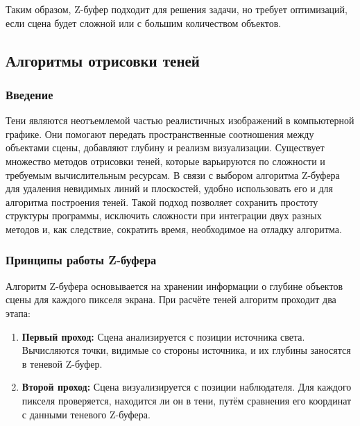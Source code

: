 Таким образом, Z-буфер подходит для решения задачи, но требует оптимизаций, если сцена будет сложной или с большим количеством объектов.




\subsection{Алгоритмы отрисовки теней}


\subsubsection{Введение}

\hspace{1.25cm}
Тени являются неотъемлемой частью реалистичных изображений в компьютерной графике. Они помогают передать пространственные соотношения между объектами сцены, добавляют глубину и реализм визуализации. Существует множество методов отрисовки теней, которые варьируются по сложности и требуемым вычислительным ресурсам. В связи с выбором алгоритма Z-буфера для удаления невидимых линий и плоскостей, удобно использовать его и для алгоритма построения теней. Такой подход позволяет сохранить простоту структуры программы, исключить сложности при интеграции двух разных методов и, как следствие, сократить время, необходимое на отладку алгоритма.


\subsubsection{Принципы работы Z-буфера}

\hspace{1.25cm}
Алгоритм Z-буфера основывается на хранении информации о глубине объектов сцены для каждого пикселя экрана. При расчёте теней алгоритм проходит два этапа:

\begin{enumerate}
    \item \textbf{Первый проход:} Сцена анализируется с позиции источника света. Вычисляются точки, видимые со стороны источника, и их глубины заносятся в теневой Z-буфер.
    \item \textbf{Второй проход:} Сцена визуализируется с позиции наблюдателя. Для каждого пикселя проверяется, находится ли он в тени, путём сравнения его координат с данными теневого Z-буфера.
\end{enumerate}


